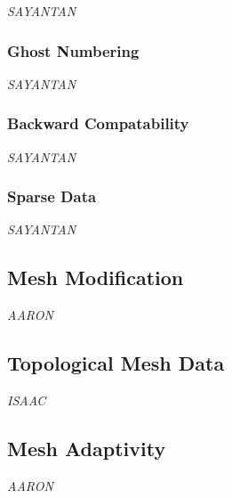 {\it SAYANTAN}

\subsubsection{Ghost Numbering}

{\it SAYANTAN}

\subsubsection{Backward Compatability}

{\it SAYANTAN}

\subsubsection{Sparse Data}

{\it SAYANTAN}

\subsection{Mesh Modification}

{\it AARON}

\subsection{Topological Mesh Data}

{\it ISAAC}

\subsection{Mesh Adaptivity}

{\it AARON}
